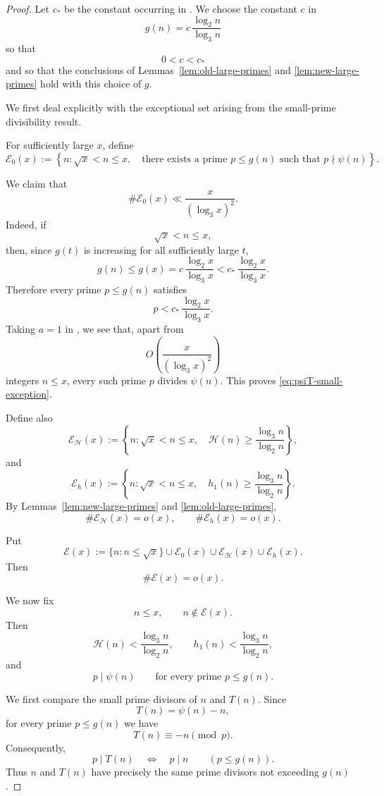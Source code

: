 \documentclass{article}
\begin{document}
\begin{proof}
Let $c_\ast$ be the constant occurring in
\cite[Lemma~2.3]{Guo}. We choose the constant $c$ in
\[
g(n)
=
c\,\frac{\log_2n}{\log_3n}
\]
so that
\[
0<c<c_\ast
\]
and so that the conclusions of
Lemmas~\ref{lem:old-large-primes} and
\ref{lem:new-large-primes} hold with this choice of $g$.

We first deal explicitly with the exceptional set arising from the
small-prime divisibility result.

For sufficiently large $x$, define
\[
\mathcal E_0(x)
:=
\left\{
n:\sqrt{x}<n\le x,\quad
\text{there exists a prime }p\le g(n)
\text{ such that }p\nmid\psi(n)
\right\}.
\]

We claim that
\begin{equation}
\#\mathcal E_0(x)
\ll
\frac{x}{(\log_3x)^2}.
\label{eq:psiT-small-exception}
\end{equation}
Indeed, if
\[
\sqrt{x}<n\le x,
\]
then, since $g(t)$ is increasing for all sufficiently large $t$,
\[
g(n)\le g(x)
=
c\,\frac{\log_2x}{\log_3x}
<
c_\ast\,\frac{\log_2x}{\log_3x}.
\]
Therefore every prime $p\le g(n)$ satisfies
\[
p<
c_\ast\,\frac{\log_2x}{\log_3x}.
\]
Taking $a=1$ in \cite[Lemma~2.3]{Guo}, we see that, apart from
\[
O\left(\frac{x}{(\log_3x)^2}\right)
\]
integers $n\le x$, every such prime $p$ divides $\psi(n)$.
This proves \eqref{eq:psiT-small-exception}.

Define also
\[
\mathcal E_{\mathcal H}(x)
:=
\left\{
n:\sqrt{x}<n\le x,\quad
\mathcal H(n)\ge
\frac{\log_3n}{\log_2n}
\right\},
\]
and
\[
\mathcal E_h(x)
:=
\left\{
n:\sqrt{x}<n\le x,\quad
h_1(n)\ge
\frac{\log_3n}{\log_2n}
\right\}.
\]
By Lemmas~\ref{lem:new-large-primes} and
\ref{lem:old-large-primes},
\[
\#\mathcal E_{\mathcal H}(x)=o(x),
\qquad
\#\mathcal E_h(x)=o(x).
\]

Put
\[
\mathcal E(x)
:=
\{n:n\le\sqrt{x}\}
\cup
\mathcal E_0(x)
\cup
\mathcal E_{\mathcal H}(x)
\cup
\mathcal E_h(x).
\]
Then
\begin{equation}
\#\mathcal E(x)=o(x).
\label{eq:psiT-total-exception}
\end{equation}

We now fix
\[
n\le x,
\qquad
n\notin\mathcal E(x).
\]
Then
\[
\mathcal H(n)
<
\frac{\log_3n}{\log_2n},
\qquad
h_1(n)
<
\frac{\log_3n}{\log_2n},
\]
and
\[
p\mid\psi(n)
\qquad
\text{for every prime }p\le g(n).
\]

We first compare the small prime divisors of $n$ and $T(n)$.
Since
\[
T(n)=\psi(n)-n,
\]
for every prime $p\le g(n)$ we have
\[
T(n)\equiv-n\pmod p.
\]
Consequently,
\begin{equation}
p\mid T(n)
\quad\Longleftrightarrow\quad
p\mid n
\qquad(p\le g(n)).
\label{eq:psiT-small-prime-equivalence}
\end{equation}
Thus $n$ and $T(n)$ have precisely the same prime divisors not
exceeding $g(n)$.


\end{proof}
\end{document}
